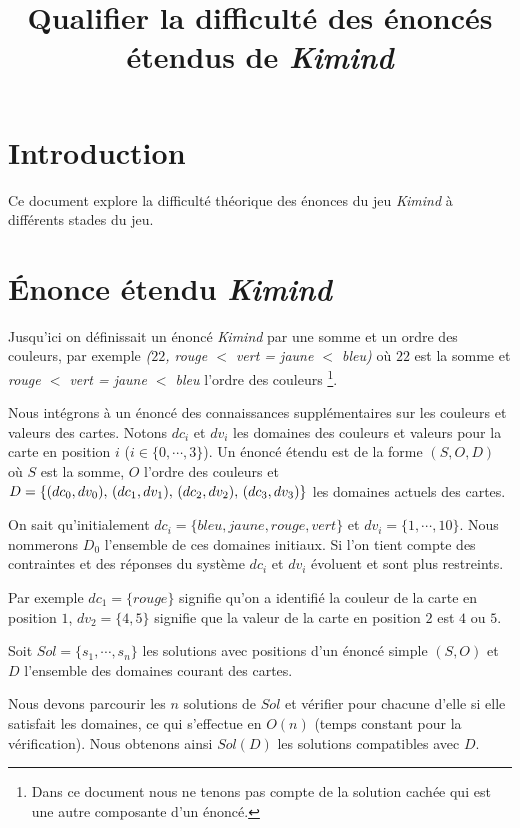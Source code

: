 \documentclass[a4paper, 12]{article}
\newcommand\set[1]{\ensuremath{\{#1\}}}
\begin{document}
\title{Qualifier la difficulté des énoncés étendus de \emph{Kimind}}
\date{}
\maketitle

\section{Introduction}
Ce document explore la difficulté théorique des énonces du jeu \emph{Kimind} à différents stades du jeu.

\section{Énonce étendu \emph{Kimind}}
Jusqu’ici on définissait un énoncé  \emph{Kimind} par une somme et un ordre des couleurs, par exemple
\emph{($22$, rouge $<$ vert = jaune $<$ bleu)} où $22$ est la somme et \emph{rouge $<$ vert = jaune $<$ bleu} l’ordre des couleurs
\footnote{Dans ce document nous ne tenons pas compte de la solution cachée qui est une autre composante d'un énoncé.}. 

Nous intégrons à un énoncé des connaissances supplémentaires sur les couleurs et valeurs des cartes.
Notons  $dc_i$ et $dv_i$ les domaines des couleurs et valeurs pour la carte en position $i$ ($i \in \set{0,\cdots, 3}$).
Un énoncé étendu est de la forme $(S, O, D)$ où $S$ est la somme, $O$ l’ordre des couleurs et
$D = \set{(dc_0, dv_0),$ $(dc_1, dv_1),$ $(dc_2,dv_2),$ $(dc_3,dv_3)}$ les domaines
actuels des cartes.

On sait qu’initialement $dc_i = \set{bleu, jaune, rouge, vert}$ et $dv_i = \set{1, \cdots, 10}$.  Nous nommerons $D_0$
l’ensemble de ces domaines initiaux.
Si l’on tient compte des contraintes et des réponses du système $dc_i$ et $dv_i$ évoluent et sont plus restreints.

Par exemple $dc_1 = \set{rouge}$ signifie qu’on a identifié la couleur de la carte en position $1$,
$dv_2 = \set{4, 5}$ signifie que la valeur de la carte en position $2$ est $4$ ou $5$.

Soit $\textit{Sol} = \set{s_1,\cdots, s_n}$ les solutions avec positions d’un énoncé simple $(S, O)$
et $D$ l’ensemble des domaines courant des cartes.

Nous devons parcourir les $n$ solutions de $Sol$ et vérifier pour chacune d’elle si elle satisfait les domaines,
ce qui s’effectue en $O(n)$ (temps constant pour la vérification).
Nous obtenons ainsi $\textit{Sol}(D)$ les solutions compatibles avec $D$.
\end{document}
